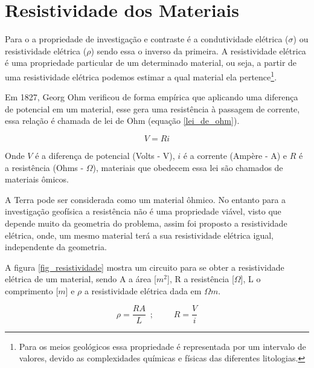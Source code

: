     \section{Resistividade dos Materiais}
    
    Para o \MT a propriedade de investigação e contraste é a condutividade elétrica ($\sigma$) ou resistividade elétrica ($\rho$) sendo essa o inverso da primeira.
    A resistividade elétrica é uma propriedade particular de um determinado material, ou seja, a partir de uma resistividade elétrica podemos estimar a qual material ela pertence\footnote{Para os meios geológicos essa propriedade é representada por um intervalo de valores, devido as complexidades químicas e físicas das diferentes litologias.}.
    
    Em 1827, Georg Ohm verificou de forma empírica que aplicando uma diferença de potencial em um material, esse gera uma resistência à passagem de corrente, essa relação é chamada de lei de Ohm (equação \ref{lei_de_ohm})\cite{eletromag8hayt}.
    
    \begin{equation}
        \label{lei_de_ohm}
        V = R i
    \end{equation}
    
    Onde $V$ é a diferença de potencial (Volts - V), $i$ é a corrente (Ampère - A) e $R$ é a resistência (Ohms - $\Omega$), materiais que obedecem essa lei são chamados de materiais ômicos.
    
    A Terra pode ser considerada como um material ôhmico. No entanto para a investigação geofísica a resistência não é uma propriedade viável, visto  que depende muito da geometria do problema, assim foi proposto a resistividade elétrica, onde, um mesmo material terá a sua resistividade elétrica igual, independente da geometria.
    
    A figura \ref{fig_resistividade} mostra um circuito para se obter a resistividade elétrica de um material, sendo A a área [$m^2$], R a resistência [$\Omega$], L o comprimento [$m$] e $\rho$ a resistividade elétrica dada em $\Omega m$. 
    
    \begin{equation}
        \label{resistividade}
        \rho = \dfrac{R A}{L}\, \, \, ;\, \, \, \, \, \, \, \, \, \, \, \, \, \,  R = \dfrac{V}{i}
    \end{equation}
    
